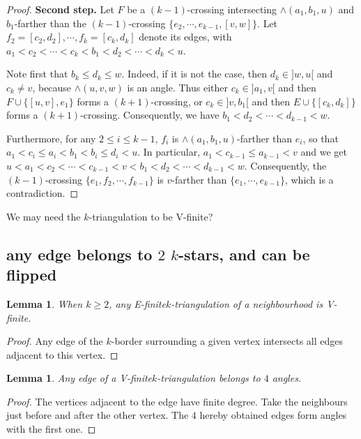 \documentclass{amsart}
\newtheorem{lemma}[theorem]{Lemma}
\theoremstyle{remark}
\newcommand*{\nbd}[0]{neighbourhood\xspace}
\newcommand*{\ef}[0]{E-finite\xspace}
\newcommand*{\vf}[0]{V-finite\xspace}
\newcommand*{\ktg}[0]{$k$-triangulation\xspace}
\begin{document}
\begin{proof}
{\bf Second step.}
Let $F$ be a $(k - 1)$-crossing intersecting $\wedge(a_1, b_1, u)$ and $b_1$-farther than the $(k-1)$-crossing $\{e_2, \cdots , e_{k-1}, [v, w]\}$. 
Let $f_2 = [c_2, d_2], \cdots , f_k = [c_k, d_k]$ denote its edges, with $a_1 < c_2 < \cdots < c_k < b_1 < d_2 < \cdots < d_k < u$.

Note first that $b_k \leq d_k \leq w$. 
Indeed, if it is not the case, then $d_k \in ]w, u[$ and $c_k \neq v$, because $\wedge(u, v, w)$ is an angle. 
Thus either $c_k \in ]a_1, v[$ and then $F \cup \{[u, v], e_1\}$ forms a $(k + 1)$-crossing, or $c_k \in ]v, b_1[$ and then $E \cup \{[c_k, d_k]\}$ forms a $(k + 1)$-crossing. 
Consequently, we have $b_1 < d_2 < \cdots < d_{k-1} < w$.

Furthermore, for any $2 \leq i \leq k - 1$, $f_i$ is $\wedge(a_1, b_1, u)$-farther than $e_i$, so that $a_1 < c_i \leq a_i < b_1 < b_i \leq d_i < u$. 
In particular, $a_1 < c_{k-1} \leq a_{k-1} < v$ and we get $u < a_1 < c_2 < \cdots < c_{k-1} < v < b_1 < d_2 < \cdots < d_{k-1} < w$.
Consequently, the $(k - 1)$-crossing $\{e_1, f_2, \cdots , f_{k-1}\}$ is
$v$-farther than $\{e_1, \cdots , e_{k-1}\}$, which is a contradiction.













\end{proof}

We may need the \ktg to be \vf?

\subsection{any edge belongs to $2$ $k$-stars, and can be flipped}

\begin{lemma}
When $k\geq 2$, any \ef \ktg of a \nbd is \vf.
\end{lemma}
\begin{proof}
Any edge of the $k$-border surrounding a given vertex intersects all edges adjacent to this vertex.
\end{proof}

\begin{lemma}
Any edge of a \vf \ktg belongs to $4$ angles.
\end{lemma}
\begin{proof}
The vertices adjacent to the edge have finite degree. Take the neighbours just before and after the other vertex. The $4$ hereby obtained edges form angles with the first one.
\end{proof}
\end{document}
